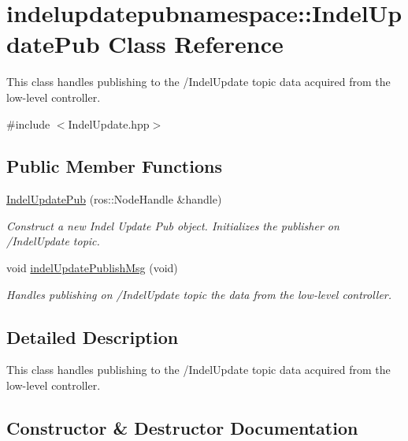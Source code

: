 \hypertarget{classindelupdatepubnamespace_1_1IndelUpdatePub}{}\section{indelupdatepubnamespace\+:\+:Indel\+Update\+Pub Class Reference}
\label{classindelupdatepubnamespace_1_1IndelUpdatePub}


This class handles publishing to the /\+Indel\+Update topic data acquired from the low-\/level controller.  




{\ttfamily \#include $<$Indel\+Update.\+hpp$>$}

\subsection*{Public Member Functions}
\begin{DoxyCompactItemize}
\item 
\hyperlink{classindelupdatepubnamespace_1_1IndelUpdatePub_a410ae8d96dc63406607ed472a0e56140}{Indel\+Update\+Pub} (ros\+::\+Node\+Handle \&handle)
\begin{DoxyCompactList}\small\item\em Construct a new Indel Update Pub object. Initializes the publisher on /\+Indel\+Update topic. \end{DoxyCompactList}\item 
void \hyperlink{classindelupdatepubnamespace_1_1IndelUpdatePub_a8ea3e14488f0844df85432ba22b8925d}{indel\+Update\+Publish\+Msg} (void)
\begin{DoxyCompactList}\small\item\em Handles publishing on /\+Indel\+Update topic the data from the low-\/level controller. \end{DoxyCompactList}\end{DoxyCompactItemize}


\subsection{Detailed Description}
This class handles publishing to the /\+Indel\+Update topic data acquired from the low-\/level controller. 

\subsection{Constructor \& Destructor Documentation}
\mbox{\label{classindelupdatepubnamespace_1_1IndelUpdatePub_a410ae8d96dc63406607ed472a0e56140}} 
